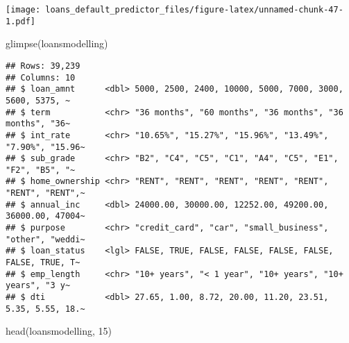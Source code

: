 \documentclass[
]{article}
\newenvironment{Shaded}{\begin{snugshade}}{\end{snugshade}}
\newcommand{\DecValTok}[1]{\textcolor[rgb]{0.00,0.00,0.81}{#1}}
\newcommand{\FunctionTok}[1]{\textcolor[rgb]{0.00,0.00,0.00}{#1}}
\newcommand{\NormalTok}[1]{#1}
\begin{document}
\texttt{[image: loans\_default\_predictor\_files/figure-latex/unnamed-chunk-47-1.pdf]}

\begin{Shaded}
\begin{Highlighting}[]
\FunctionTok{glimpse}\NormalTok{(loansmodelling)}
\end{Highlighting}
\end{Shaded}

\begin{verbatim}
## Rows: 39,239
## Columns: 10
## $ loan_amnt      <dbl> 5000, 2500, 2400, 10000, 5000, 7000, 3000, 5600, 5375, ~
## $ term           <chr> "36 months", "60 months", "36 months", "36 months", "36~
## $ int_rate       <chr> "10.65%", "15.27%", "15.96%", "13.49%", "7.90%", "15.96~
## $ sub_grade      <chr> "B2", "C4", "C5", "C1", "A4", "C5", "E1", "F2", "B5", "~
## $ home_ownership <chr> "RENT", "RENT", "RENT", "RENT", "RENT", "RENT", "RENT",~
## $ annual_inc     <dbl> 24000.00, 30000.00, 12252.00, 49200.00, 36000.00, 47004~
## $ purpose        <chr> "credit_card", "car", "small_business", "other", "weddi~
## $ loan_status    <lgl> FALSE, TRUE, FALSE, FALSE, FALSE, FALSE, FALSE, TRUE, T~
## $ emp_length     <chr> "10+ years", "< 1 year", "10+ years", "10+ years", "3 y~
## $ dti            <dbl> 27.65, 1.00, 8.72, 20.00, 11.20, 23.51, 5.35, 5.55, 18.~
\end{verbatim}

\begin{Shaded}
\begin{Highlighting}[]
\FunctionTok{head}\NormalTok{(loansmodelling, }\DecValTok{15}\NormalTok{)}
\end{Highlighting}
\end{Shaded}
\end{document}
